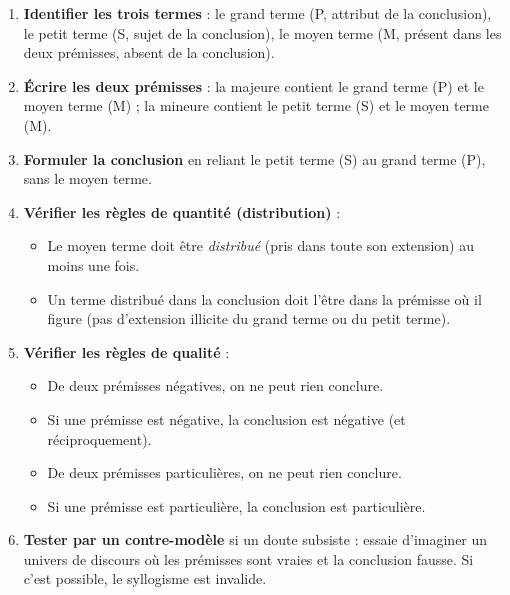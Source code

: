 \documentclass[11pt]{article}
\newcommand{\cle}[1]{{\popxbold\color{popdark}#1}}
\begin{document}
\begin{methode}
\begin{enumerate}
\item \textbf{Identifier les trois termes} : le \cle{grand terme} (P, attribut de la conclusion), le \cle{petit terme} (S, sujet de la conclusion), le \cle{moyen terme} (M, présent dans les deux prémisses, absent de la conclusion).
\item \textbf{Écrire les deux prémisses} : la \cle{majeure} contient le grand terme (P) et le moyen terme (M) ; la \cle{mineure} contient le petit terme (S) et le moyen terme (M).
\item \textbf{Formuler la conclusion} en reliant le petit terme (S) au grand terme (P), sans le moyen terme.
\item \textbf{Vérifier les règles de quantité (distribution)} :
      \begin{itemize}
      \item Le moyen terme doit être \emph{distribué} (pris dans toute son extension) au moins une fois.
      \item Un terme distribué dans la conclusion doit l'être dans la prémisse où il figure (pas d'extension illicite du grand terme ou du petit terme).
      \end{itemize}
\item \textbf{Vérifier les règles de qualité} :
      \begin{itemize}
      \item De deux prémisses négatives, on ne peut rien conclure.
      \item Si une prémisse est négative, la conclusion est négative (et réciproquement).
      \item De deux prémisses particulières, on ne peut rien conclure.
      \item Si une prémisse est particulière, la conclusion est particulière.
      \end{itemize}
\item \textbf{Tester par un contre-modèle} si un doute subsiste : essaie d'imaginer un univers de discours où les prémisses sont vraies et la conclusion fausse. Si c'est possible, le syllogisme est invalide.
\end{enumerate}
\end{methode}
\end{document}
